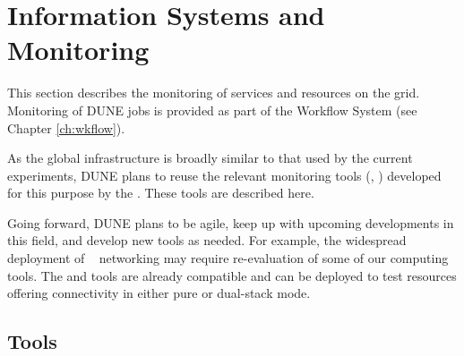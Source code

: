 \documentclass[../main-v1.tex]{subfiles}
\begin{document}
\chapter{Information Systems and Monitoring }
\label{ch:mon}

\FPadd\MonEtfTotalPeople\MonEtfOpsPeople\MonEtfDevPeople %

This section %
describes the monitoring of services and resources on the grid. %
Monitoring of DUNE jobs is provided as part of the Workflow System (see Chapter \ref{ch:wkflow}).

As the global infrastructure is broadly similar to that used by the current  experiments, DUNE plans to reuse the relevant monitoring tools (, ) developed for this purpose by the . %
These tools are described here. 

Going forward, DUNE plans to be agile, keep up with upcoming developments in this field, and develop new tools as needed. For example, the widespread deployment of ~\cite{bib:ipv6TaskForce} networking may require re-evaluation of some of our computing tools.  The  and  tools are already  compatible and can be deployed to test resources offering  connectivity in either pure or dual-stack mode.

\section{Tools}
\label{sec:mon:xyz}  %
\end{document}
